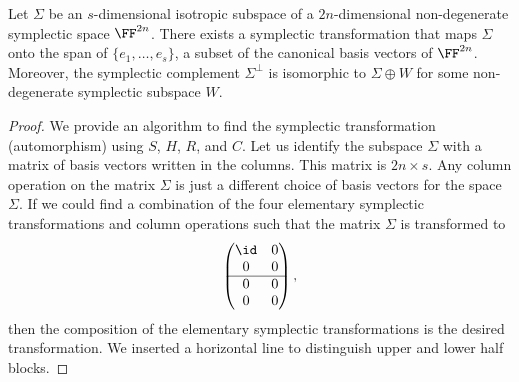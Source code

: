 \begin{prop}
Let $\Sigma$ be an $s$-dimensional isotropic subspace 
of a $2n$-dimensional non-degenerate symplectic space $\FF^{2n}$.
There exists a symplectic transformation that maps $\Sigma$ 
onto the span of $\{e_1,\ldots, e_s\}$, a subset of the canonical basis vectors of $\FF^{2n}$.
Moreover, the symplectic complement $\Sigma^\perp$ is isomorphic to
$\Sigma \oplus W$ for some non-degenerate symplectic subspace $W$.
\label{IsotropicSubspaceComplement}
\end{prop}
\begin{proof}
We provide an algorithm to find the symplectic transformation (automorphism)
using $S$, $H$, $R$, and $C$.
Let us identify the subspace $\Sigma$ with a matrix of basis vectors written in the columns.
This matrix is $2n \times s$.
Any column operation on the matrix $\Sigma$ is just a different choice of basis vectors
for the space $\Sigma$.
If we could find a combination of the four elementary symplectic transformations
and column operations
such that the matrix $\Sigma$ is transformed to 
\begin{align*}
\begin{pmatrix}
\id & 0 \\
0 & 0 \\
\hline
0 & 0 \\
0 & 0
\end{pmatrix},
\end{align*}
then the composition of the elementary symplectic transformations
is the desired transformation.
We inserted a horizontal line to distinguish upper and lower half blocks.


\end{proof}
